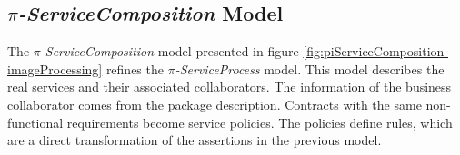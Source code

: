 \subsection{\textit{$\pi$-ServiceComposition} Model}

The \textit{$\pi$-ServiceComposition} model presented in figure
\ref{fig:piServiceComposition-imageProcessing} refines the 
\textit{$\pi$-ServiceProcess} model. This model
describes the real services and their associated collaborators. The information
of the business collaborator comes from the package description. Contracts with
the same non-functional requirements become service policies. The policies
define rules, which are a direct transformation of the assertions in the
previous model.

 
